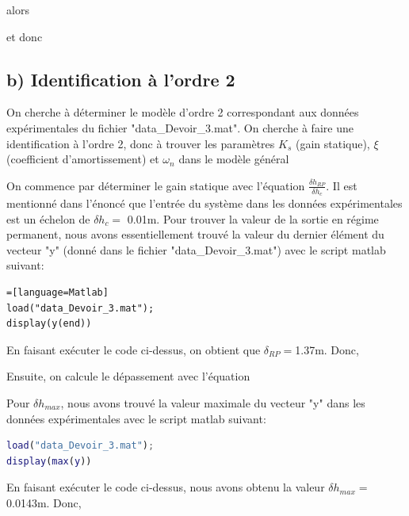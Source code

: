 \raggedright \normalsize alors \newline \center \huge {} 
\raggedright \normalsize et donc \newline \center \Large
{}


\raggedright \normalsize
\subsection*{b) Identification à l'ordre 2}
On cherche à déterminer le modèle d'ordre 2 correspondant aux données expérimentales du fichier "data\_Devoir\_3.mat". On cherche à faire une identification à l'ordre 2, donc à trouver les paramètres $K_{s}$ (gain statique), $\xi$ (coefficient d'amortissement) et $\omega_{n}$ dans le modèle général

\center \LARGE {} 


\raggedright \normalsize On commence par déterminer le gain statique avec l'équation $\frac{\delta h_{RP}}{\delta h_{c}}$. Il est mentionné dans l'énoncé que l'entrée du système dans les données expérimentales est un échelon de $\delta h_{c}=$ 0.01m. Pour trouver la valeur de la sortie en régime permanent, nous avons essentiellement trouvé la valeur du dernier élément du vecteur "y" (donné dans le fichier "data\_Devoir\_3.mat") avec le script matlab suivant:
\begin{lstlisting}=[language=Matlab]
load("data_Devoir_3.mat");
display(y(end))
\end{lstlisting}
En faisant exécuter le code ci-dessus, on obtient que $\delta_{RP}=$1.37m. Donc,

\center \Large {}

\raggedright \normalsize Ensuite, on calcule le dépassement avec l'équation 

\center \Large {}

\raggedright \normalsize Pour $\delta h_{max}$, nous avons trouvé la valeur maximale du vecteur "y" dans les données expérimentales avec le script matlab suivant:
\begin{lstlisting}[language=Matlab]
load("data_Devoir_3.mat");
display(max(y))
\end{lstlisting}
En faisant exécuter le code ci-dessus, nous avons obtenu la valeur $\delta h_{max}=$0.0143m. \newpage \noindent Donc, 

